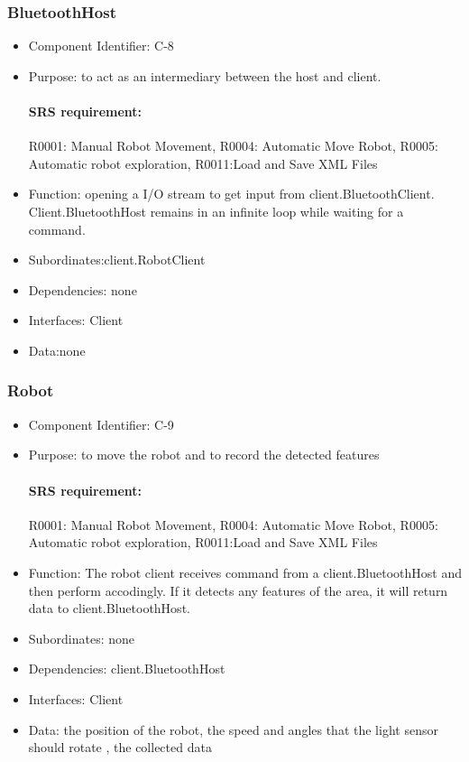 \documentclass[11pt, a4paper]{report}
\begin{document}
\subsubsection{BluetoothHost}
\begin{itemize}
\item Component Identifier: C-8
\item Purpose: to act as an intermediary between the host and client.
\paragraph{SRS requirement:} R0001: Manual Robot Movement, R0004: Automatic Move Robot,
R0005: Automatic robot exploration, R0011:Load and Save XML Files
\item Function: opening a I/O stream to get input from client.BluetoothClient.
Client.BluetoothHost remains in an infinite loop while waiting for a command.
\item Subordinates:client.RobotClient
\item Dependencies: none
\item Interfaces: Client
\item Data:none
\end{itemize}



\subsubsection{Robot}
\begin{itemize}
\item Component Identifier: C-9
\item Purpose: to move the robot and to record the detected features
\paragraph{SRS requirement:}R0001: Manual Robot Movement, R0004: Automatic Move Robot,
R0005: Automatic robot exploration, R0011:Load and Save XML Files
\item Function: The robot client receives command from a client.BluetoothHost and then perform
accodingly. If it detects any features of the area, it will return data to client.BluetoothHost.
\item Subordinates: none
\item Dependencies: client.BluetoothHost
\item Interfaces:  Client
\item Data: the position of the robot, the speed and angles that the light sensor should rotate
, the collected data
\end{itemize}
\end{document}
